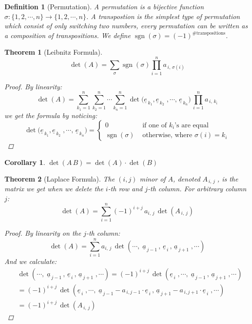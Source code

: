 \documentclass[12pt]{article}
\newcommand{\tuple}[1]{\underline{#1}}
\newtheorem{theorem}{Theorem}[subsection]
\newtheorem{definition}{Definition}[subsection]
\newtheorem{corollary}{Corollary}[subsection]
\begin{document}
\begin{definition}[Permutation]
  A permutation is a bijective function $\sigma:\{1,2,\cdots,n\}\to\{1,2,\cdots,n\}$. A transpostion is the simplest type of permutation which consist of only switching two numbers, every permutation can be written as a composition of transpositions. We define $\operatorname{sgn}(\sigma)=(-1)^\text{\# transpositions}$.
\end{definition}

\begin{theorem}[Leibnitz Formula]
  $$\det(A)=\sum_\sigma \operatorname{sgn}(\sigma)\prod_{i=1}^n a_{\,i,\,\sigma(i)}$$
  \begin{proof}
    By linearity:
    $$
    \det(A)=\sum_{k_1=1}^n\sum_{k_2=1}^n\cdots\sum_{k_n=1}^n \det\big(\tuple{e}_{\,k_1},\tuple{e}_{\,k_2}\;,\cdots,\,\tuple{e}_{\,k_n}\big)\,\prod_{i=1}^n a_{\,i,\,k_i}
    $$
    we get the formula by noticing:
    $$
    \det\big(\tuple{e}_{\,k_1},\tuple{e}_{\,k_2}\;,\cdots,\,\tuple{e}_{\,k_n}\big)=
    \begin{cases}
      0 &\text{ if one of }k_i\text{'s are equal}\\
      \operatorname{sgn}(\sigma) &\text{ otherwise, where }\sigma(i)=k_i
    \end{cases}
    $$
  \end{proof}
\end{theorem}

\begin{corollary}
  $\det(A\,B)=\det(A)\cdot \det(B)$
\end{corollary}

\begin{theorem}[Laplace Formula]
  The $(i,j)$ minor of $A$, denoted $A_{\,i,\,j}\;$, is the matrix we get when we delete the $i$-th row and $j$-th column.
  For arbitrary column $j$:
  $$
  \det(A)=\sum_{i=1}^n(-1)^{i+j}\,a_{i,\,j}\,\det(A_{\,i,\,j})
  $$
  \begin{proof}
    By linearity on the $j$-th column:
    $$
    \det(A)=\sum_{i=1}^n a_{i,\,j}\,\det(\cdots,\;\tuple{a}_{\,j-1}\,,\,\tuple{e}_{\,i}\,,\,\tuple{a}_{\,j+1}\;,\cdots)
    $$
    And we calculate:
    \begin{align*}
      &\det(\cdots,\;\tuple{a}_{\,j-1}\,,\,\tuple{e}_{\,i}\,,\,\tuple{a}_{\,j+1}\;,\cdots)=(-1)^{i+j}\,\det(\tuple{e}_{\,i}\;,\cdots,\;\tuple{a}_{\,j-1}\,,\,\tuple{a}_{\,j+1}\;,\cdots)\\
      &=(-1)^{i+j}\,\det(\tuple{e}_{\,i}\;,\cdots,\;\tuple{a}_{\,j-1}-a_{\,i,j-1}\cdot\tuple{e}_{\,i}\,,\,\tuple{a}_{\,j+1}-a_{\,i,j+1}\cdot\tuple{e}_{\,i}\;,\cdots)\\
      &=(-1)^{i+j}\,\det(A_{\,i,\,j})
    \end{align*}
  \end{proof}
\end{theorem}
\end{document}
